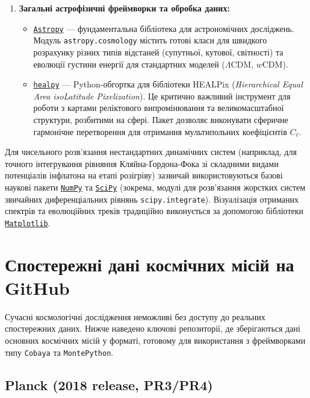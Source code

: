 \begin{enumerate}[leftmargin=*]
    \item \textbf{Загальні астрофізичні фреймворки та обробка даних:}
    \begin{itemize}
        \item \href{https://www.astropy.org/}{\texttt{Astropy}} --- фундаментальна бібліотека для астрономічних досліджень. Модуль \texttt{astropy.cosmology} містить готові класи для швидкого розрахунку різних типів відстаней (супутньої, кутової, світності) та еволюції густини енергії для стандартних моделей ($\Lambda\text{CDM}$, $w\text{CDM}$).
        \item \href{https://healpy.readthedocs.io/}{\texttt{healpy}} --- Python-обгортка для бібліотеки HEALPix (\emph{Hierarchical Equal Area isoLatitude Pixelization}). Це критично важливий інструмент для роботи з картами реліктового випромінювання та великомасштабної структури, розбитими на сфері. Пакет дозволяє виконувати сферичне гармонічне перетворення для отримання мультипольних коефіцієнтів $C_\ell$.
    \end{itemize}
\end{enumerate}

Для чисельного розв'язання нестандартних динамічних систем (наприклад, для точного інтегрування рівняння Кляйна-Ґордона-Фока зі складними видами потенціалів інфлатона на етапі розігріву) зазвичай використовуються базові наукові пакети \href{https://numpy.org/}{\texttt{NumPy}} та \href{https://scipy.org/}{\texttt{SciPy}} (зокрема, модулі для розв'язання жорстких систем звичайних диференціальних рівнянь \texttt{scipy.integrate}). Візуалізація отриманих спектрів та еволюційних треків традиційно виконується за допомогою бібліотеки \href{https://matplotlib.org/}{\texttt{Matplotlib}}.


\section{Спостережні дані космічних місій на GitHub}

Сучасні космологічні дослідження неможливі без доступу до реальних
спостережних даних. Нижче наведено ключові репозиторії, де зберігаються
дані основних космічних місій у форматі, готовому для використання з
фреймворками типу \texttt{Cobaya} та \texttt{MontePython}.

\subsection*{Planck (2018 release, PR3/PR4)}

